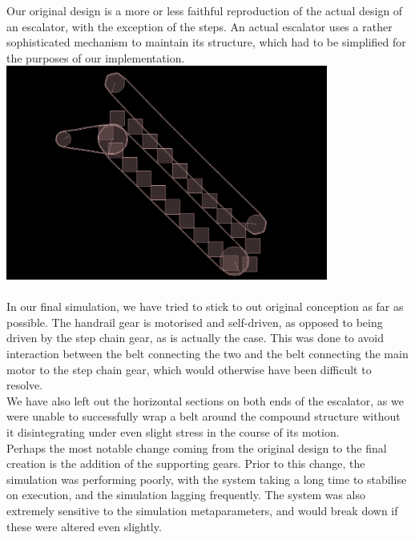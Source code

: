 \documentclass[11pt]{article}
\begin{document}
	Our original design is a more or less faithful reproduction of the actual design of an escalator, with the exception of the steps. An actual escalator uses a rather sophisticated mechanism to maintain its structure, which had to be simplified for the purposes of our implementation.\\
	
	\includegraphics[width=300pt, height=200pt]{../plots/initial.png}\\\\

	In our final simulation, we have tried to stick to out original conception as far as possible. The handrail gear is motorised and self-driven, as opposed to being driven by the step chain gear, as is actually the case. This was done to avoid interaction between the belt connecting the two and the belt connecting the main motor to the step chain gear, which would otherwise have been difficult to resolve.\\
	
	We have also left out the horizontal sections on both ends of the escalator, as we were unable to successfully wrap a belt around the compound structure without it disintegrating under even slight stress in the course of its motion.\\

	Perhaps the most notable change coming from the original design to the final creation is the addition of the supporting gears. Prior to this change, the simulation was performing poorly, with the system taking a long time to stabilise on execution, and the simulation lagging frequently. The system was also extremely sensitive to the simulation metaparameters, and would break down if these were altered even slightly.\\
\end{document}
